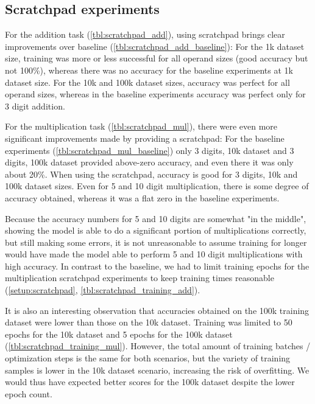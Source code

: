 \FloatBarrier
\subsection{Scratchpad experiments}
\label{results:scratchpad}


For the addition task (\cref{tbl:scratchpad_add}), using scratchpad brings clear improvements over baseline (\cref{tbl:scratchpad_add_baseline}): For the 1k dataset size, training was more or less successful for all operand sizes (good accuracy but not 100\%), whereas there was no accuracy for the baseline experiments at 1k dataset size.
For the 10k and 100k dataset sizes, accuracy was perfect for all operand sizes, whereas in the baseline experiments accuracy was perfect only for 3 digit addition.

For the multiplication task (\cref{tbl:scratchpad_mul}), there were even more significant improvements made by providing a scratchpad: For the baseline experiments (\cref{tbl:scratchpad_mul_baseline}) only 3 digits, 10k dataset and 3 digits, 100k dataset provided above-zero accuracy, and even there it was only about 20\%. When using the scratchpad, accuracy is good for 3 digits, 10k and 100k dataset sizes.
Even for 5 and 10 digit multiplication, there is some degree of accuracy obtained, whereas it was a flat zero in the baseline experiments.

Because the accuracy numbers for 5 and 10 digits are somewhat "in the middle", showing the model is able to do a significant portion of multiplications correctly, but still making some errors, it is not unreasonable to assume training for longer would have made the model able to perform 5 and 10 digit multiplications with high accuracy. In contrast to the baseline, we had to limit training epochs for the multiplication scratchpad experiments to keep training times reasonable (\cref{setup:scratchpad}, \cref{tbl:scratchpad_training_add}).

It is also an interesting observation that accuracies obtained on the 100k training dataset were lower than those on the 10k dataset. Training was limited to 50 epochs for the 10k dataset and 5 epochs for the 100k dataset (\cref{tbl:scratchpad_training_mul}). However, the total amount of training batches / optimization steps is the same for both scenarios, but the variety of training samples is lower in the 10k dataset scenario, increasing the risk of overfitting.
We would thus have expected better scores for the 100k dataset despite the lower epoch count.

